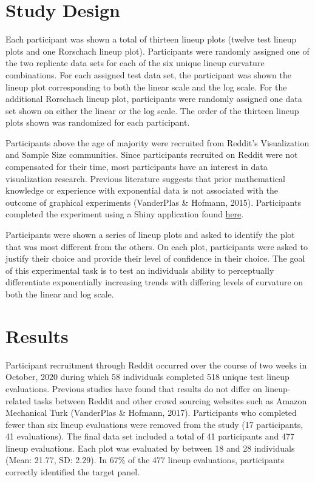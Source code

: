 \documentclass[print]{nuthesis}
\begin{document}
\hypertarget{study-design}{%
\section{Study Design}\label{study-design}}

Each participant was shown a total of thirteen lineup plots (twelve test lineup plots and one Rorschach lineup plot).
Participants were randomly assigned one of the two replicate data sets for each of the six unique lineup curvature combinations.
For each assigned test data set, the participant was shown the lineup plot corresponding to both the linear scale and the log scale.
For the additional Rorschach lineup plot, participants were randomly assigned one data set shown on either the linear or the log scale.
The order of the thirteen lineup plots shown was randomized for each participant.

Participants above the age of majority were recruited from Reddit's Visualization and Sample Size communities.
Since participants recruited on Reddit were not compensated for their time, most participants have an interest in data visualization research.
Previous literature suggests that prior mathematical knowledge or experience with exponential data is not associated with the outcome of graphical experiments (VanderPlas \& Hofmann, 2015).
Participants completed the experiment using a Shiny application found \href{https://shiny.srvanderplas.com/log-study/}{here}.

Participants were shown a series of lineup plots and asked to identify the plot that was most different from the others.
On each plot, participants were asked to justify their choice and provide their level of confidence in their choice.
The goal of this experimental task is to test an individuals ability to perceptually differentiate exponentially increasing trends with differing levels of curvature on both the linear and log scale.

\hypertarget{results}{%
\section{Results}\label{results}}

Participant recruitment through Reddit occurred over the course of two weeks in October, 2020 during which 58 individuals completed 518 unique test lineup evaluations.
Previous studies have found that results do not differ on lineup-related tasks between Reddit and other crowd sourcing websites such as Amazon Mechanical Turk (VanderPlas \& Hofmann, 2017).
Participants who completed fewer than six lineup evaluations were removed from the study (17 participants, 41 evaluations).
The final data set included a total of 41 participants and 477 lineup evaluations.
Each plot was evaluated by between 18 and 28 individuals (Mean: 21.77, SD: 2.29).
In 67\% of the 477 lineup evaluations, participants correctly identified the target panel.
\end{document}
